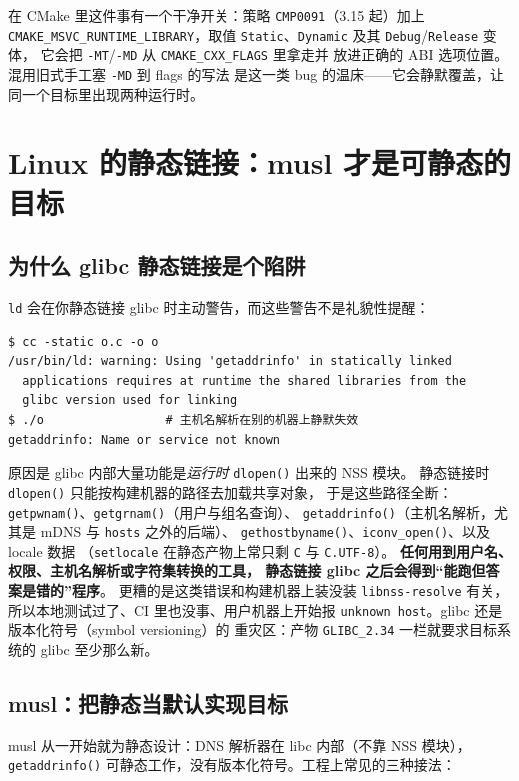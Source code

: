 \documentclass[12pt,a4paper,fontset=fandol]{ctexbook}
\newcommand{\Fn}[1]{\texttt{#1()}}
\newcommand{\Tp}[1]{\texttt{#1}}
\newcommand{\Short}[1]{\texttt{-#1}}
\newcommand{\Bk}{\allowbreak}
\begin{document}
在 CMake 里这件事有一个干净开关：策略 \Tp{CMP0091}（3.15 起）加上
\Tp{CMAKE\Bk\_MSVC\Bk\_RUNTIME\Bk\_LIBRARY}，取值
\Tp{Static}、\Tp{Dynamic} 及其 \Tp{Debug}/{\Bk}\Tp{Release} 变体，
它会把 \Short{MT}/{\Bk}\Short{MD} 从 \Tp{CMAKE\Bk\_CXX\_FLAGS} 里拿走并
放进正确的 ABI 选项位置。混用旧式手工塞 \Short{MD} 到 flags 的写法
是这一类 bug 的温床——它会静默覆盖，让同一个目标里出现两种运行时。

\section{Linux 的静态链接：musl 才是可静态的目标}

\subsection{为什么 glibc 静态链接是个陷阱}

\Tp{ld} 会在你静态链接 glibc 时主动警告，而这些警告不是礼貌性提醒：

\begin{lstlisting}[style=shellstyle,caption={静态链接 glibc：链接器与运行时的真实输出}]
$ cc -static o.c -o o
/usr/bin/ld: warning: Using 'getaddrinfo' in statically linked
  applications requires at runtime the shared libraries from the
  glibc version used for linking
$ ./o                 # 主机名解析在别的机器上静默失效
getaddrinfo: Name or service not known
\end{lstlisting}

原因是 glibc 内部大量功能是\emph{运行时} \Fn{dlopen} 出来的 NSS 模块。
静态链接时 \Fn{dlopen} 只能按构建机器的路径去加载共享对象，
于是这些路径全断：\Fn{getpwnam}、\Fn{getgrnam}（用户与组名查询）、
\Fn{getaddrinfo}（主机名解析，尤其是 mDNS 与 \Tp{hosts} 之外的后端）、
\Fn{gethostbyname}、\Fn{iconv\_open}、以及 locale 数据
（\Tp{setlocale} 在静态产物上常只剩 \Tp{C} 与 \Tp{C.UTF-8}）。
\textbf{任何用到用户名、权限、主机名解析或字符集转换的工具，
静态链接 glibc 之后会得到``能跑但答案是错的''程序}。
更糟的是这类错误和构建机器上装没装 \Tp{libnss-resolve} 有关，
所以本地测试过了、CI 里也没事、用户机器上开始报
\lstinline|unknown host|。glibc 还是版本化符号（symbol versioning）的
重灾区：产物 \Tp{GLIBC\_2.34} 一栏就要求目标系统的 glibc 至少那么新。

\subsection{musl：把静态当默认实现目标}

musl 从一开始就为静态设计：DNS 解析器在 libc 内部（不靠 NSS 模块），
\Fn{getaddrinfo} 可静态工作，没有版本化符号。工程上常见的三种接法：
\end{document}
